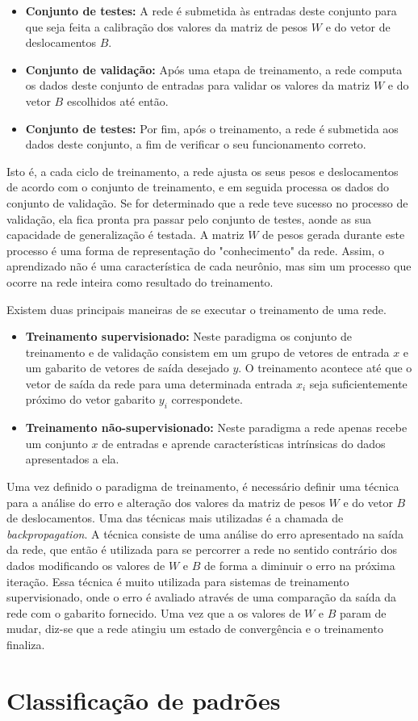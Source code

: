 \begin{itemize}
	\item \textbf{Conjunto de testes:} A rede é submetida às entradas deste conjunto para que seja feita a calibração dos valores da matriz de pesos $W$ e do vetor de deslocamentos $B$.
	
	\item \textbf{Conjunto de validação:} Após uma etapa de treinamento, a rede computa os dados deste conjunto de entradas para validar os valores da matriz $W$ e do vetor $B$ escolhidos até então.
	
	\item \textbf{Conjunto de testes:} Por fim, após o treinamento, a rede é submetida aos dados deste conjunto, a fim de verificar o seu funcionamento correto.
\end{itemize}

Isto é, a cada ciclo de treinamento, a rede ajusta os seus pesos e deslocamentos de acordo com o conjunto de treinamento, e em seguida processa os dados do conjunto de validação. Se for determinado que a rede teve sucesso no processo de validação, ela fica pronta pra passar pelo conjunto de testes, aonde as sua capacidade de generalização é testada. A matriz $W$ de pesos gerada durante este processo é uma forma de representação do "conhecimento" da rede. Assim, o aprendizado não é uma característica de cada neurônio, mas sim um processo que ocorre na rede inteira como resultado do treinamento\cite{Kozabov}.

Existem duas principais maneiras de se executar o treinamento de uma rede.

\begin{itemize}
	\item \textbf{Treinamento supervisionado:} Neste paradigma os conjunto de treinamento e de validação consistem em um grupo de vetores de entrada $x$ e um gabarito de vetores de saída desejado $y$. O treinamento acontece até que o vetor de saída da rede para uma determinada entrada $x_i$ seja suficientemente próximo do vetor gabarito $y_i$ correspondete.
	
	
	\item \textbf{Treinamento não-supervisionado:} Neste paradigma a rede apenas recebe um conjunto $x$ de entradas e aprende características intrínsicas do dados apresentados a ela.
	
\end{itemize}

Uma vez definido o paradigma de treinamento, é necessário definir uma técnica para a análise do erro e alteração dos valores da matriz de pesos $W$ e do vetor $B$ de deslocamentos. Uma das técnicas mais utilizadas é a chamada de \textit{backpropagation}\cite{DeepLearning, ZhangNNSurvey}. A técnica consiste de uma análise do erro apresentado na saída da rede, que então é utilizada para se percorrer a rede no sentido contrário dos dados modificando os valores de $W$ e $B$ de forma a diminuir o erro na próxima iteração. Essa técnica é muito utilizada para sistemas de treinamento supervisionado, onde o erro é avaliado através de uma comparação da saída da rede com o gabarito fornecido. Uma vez que a os valores de $W$ e $B$ param de mudar, diz-se que a rede atingiu um estado de convergência\cite{Kozabov} e o treinamento finaliza.


\section{Classificação de padrões}
